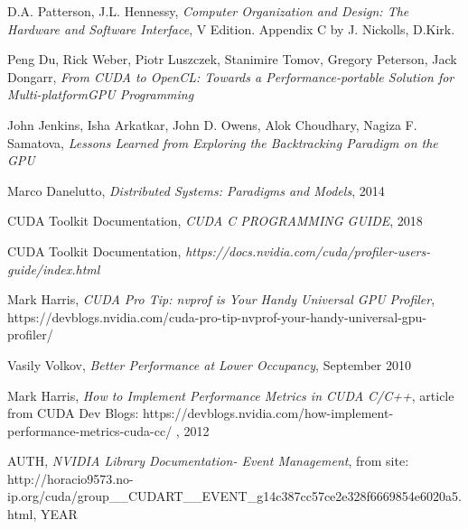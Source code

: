 \documentclass[12pt]{report}
\begin{document}
\renewcommand{\familydefault}{\sfdefault}

\hypersetup {
    colorlinks,
    citecolor= green,
    filecolor= black,
    linkcolor= black,
    urlcolor= black
}

%

	
    
    \tableofcontents
    
    
    
    
    
    
    
    \listoftables
	
	\begin{thebibliography}{9}
		D.A. Patterson, J.L. Hennessy, 
		\textit{Computer Organization and Design: The Hardware and Software Interface}, V Edition. Appendix C by J. Nickolls, D.Kirk.
	
		Peng Du, Rick Weber, Piotr Luszczek, Stanimire Tomov, Gregory Peterson, Jack Dongarr, 
		\textit{From CUDA to OpenCL: Towards a Performance-portable Solution for Multi-platformGPU Programming}
		
		John Jenkins, Isha Arkatkar, John D. Owens, Alok Choudhary, Nagiza F. Samatova, 
		\textit{Lessons Learned from Exploring the Backtracking Paradigm on the GPU}
		
		
		Marco Danelutto,
		\textit{Distributed Systems: Paradigms and Models}, 2014
		
		CUDA Toolkit Documentation, 		
		\textit{CUDA C PROGRAMMING GUIDE}, 2018
		
		CUDA Toolkit Documentation, 
		\textit{https://docs.nvidia.com/cuda/profiler-users-guide/index.html}
		
		Mark Harris, 
		\textit{CUDA Pro Tip: nvprof is Your Handy Universal GPU Profiler}, https://devblogs.nvidia.com/cuda-pro-tip-nvprof-your-handy-universal-gpu-profiler/
		
		Vasily Volkov,
		\textit{Better Performance at Lower Occupancy}, September 2010
		
		Mark Harris, \textit{How to Implement Performance Metrics in CUDA C/C++}, article from CUDA Dev Blogs: https://devblogs.nvidia.com/how-implement-performance-metrics-cuda-cc/ , 2012 
		
		AUTH, \textit{NVIDIA Library Documentation- Event Management}, from site: http://horacio9573.no-ip.org/cuda/group\_\_CUDART\_\_EVENT\_g14c387cc57ce2e328f6669854e6020a5.html, YEAR
		
	
	\end{thebibliography}

\end{document}
